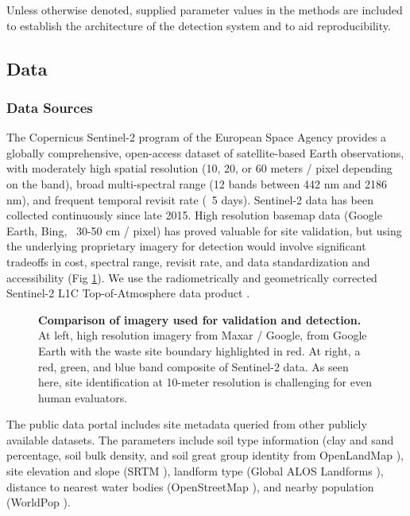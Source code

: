 \documentclass[10pt,letterpaper]{article}
\begin{document}
Unless otherwise denoted, supplied parameter values in the methods are included to establish the architecture of the detection system and to aid reproducibility.

\subsection*{Data}\label{methods:data}
\subsubsection*{Data Sources}
The Copernicus Sentinel-2 program of the European Space Agency provides a globally comprehensive, open-access dataset of satellite-based Earth observations, with moderately high spatial resolution (10, 20, or 60 meters / pixel depending on the band), broad multi-spectral range (12 bands between 442 nm and 2186 nm), and frequent temporal revisit rate (~5 days). Sentinel-2 data has been collected continuously since late 2015. High resolution basemap data (Google Earth, Bing, ~30-50 cm / pixel) has proved valuable for site validation, but using the underlying proprietary imagery for detection would involve significant tradeoffs in cost, spectral range, revisit rate, and data standardization and accessibility (Fig \ref{fig:sentinel_data}). We use the radiometrically and geometrically corrected Sentinel-2 L1C Top-of-Atmosphere data product \cite{sentinel2user}.

\begin{figure}[!h]
    \caption{{\bf Comparison of imagery used for validation and detection.}
    At left, high resolution imagery from Maxar / Google, from Google Earth with the waste site boundary highlighted in red. At right, a red, green, and blue band composite of Sentinel-2 data. As seen here, site identification at 10-meter resolution is challenging for even human evaluators.}
    \label{fig:sentinel_data}
\end{figure}

The public data portal includes site metadata queried from other publicly available datasets. The parameters include soil type information (clay and sand percentage, soil bulk density, and soil great group identity from OpenLandMap \cite{hengl_tomislav_2019_3274342}), site elevation and slope (SRTM \cite{farr2007shuttle}), landform type (Global ALOS Landforms \cite{theobald2015ecologically}), distance to nearest water bodies (OpenStreetMap \cite{haklay2008openstreetmap}), and nearby population (WorldPop \cite{tatem2017worldpop}).
\end{document}

